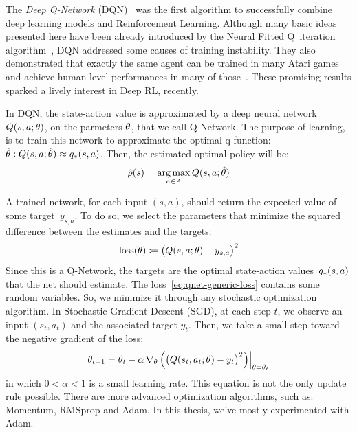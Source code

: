 The \emph{Deep Q-Network} (DQN)~\cite{bib:atari-deeprl} was the first algorithm to successfully
combine deep learning models and Reinforcement Learning. Although many basic
ideas presented here have been already introduced by the Neural Fitted
Q~iteration algorithm~\cite{bib:nfq}, DQN addressed some causes of training
instability. They also demonstrated that exactly the same agent can be trained
in many Atari games and achieve human-level performances in many of
those~\cite{bib:atari-deepq-nature}. These promising results sparked a lively
interest in Deep RL, recently.

In DQN, the state-action value is approximated by a deep neural network ${Q(s,
a; \theta)}$, on the parmeters $\theta$, that we call Q-Network. The purpose
of learning, is to train this network to approximate the optimal q-function: 
$\hat{\theta}: Q(s, a; \hat{\theta}) \approx {q}_*(s, a)$. Then, the
estimated optimal policy will be:
\begin{equation}
	\hat{\rho}(s) = \operatorname*{arg\,max}_{a \in A} Q(s, a; \hat{\theta})
\end{equation}

A trained network, for each input $(s, a)$, should return the expected value
of some target~$y_{s,a}$. To do so, we select the parameters that minimize the
squared difference between the estimates and the targets:
\begin{equation}
	\text{loss}(\theta) \coloneqq \bigl(Q(s, a; \theta) - y_{s,a} \bigr)^2
	\label{eq:qnet-generic-loss}
\end{equation}
Since this is a Q-Network, the targets are the optimal state-action
values~${q}_*(s, a)$ that the net should estimate.  The
loss~\eqref{eq:qnet-generic-loss} contains some random variables. So, we
minimize it through any stochastic optimization algorithm. In Stochastic
Gradient Descent (SGD), at each step $t$, we observe an input ${(s_t, a_t)}$ and the
associated target $y_t$. Then, we take a small step toward the negative
gradient of the loss:
\begin{equation}
	\theta_{t+1} = \theta_t - \alpha\, \nabla_{\theta}\,
	\Bigl( \bigl(Q(s_t, a_t; \theta) - y_t \bigr)^2 \Bigr) \Big|_{\theta =
	\theta_t}
	\label{eq:sgd-update}
\end{equation}
in which $0 < \alpha < 1$ is a small learning rate. This equation is not
the only update rule possible. There are more advanced optimization
algorithms, such as: Momentum, RMSprop and Adam. In this thesis, we've
mostly experimented with Adam.

